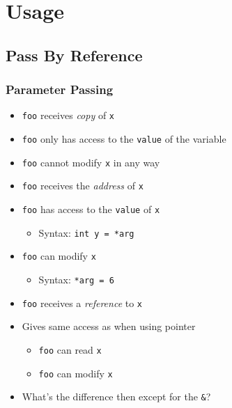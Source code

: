 \section{Usage}
\subsection{Pass By Reference}

\frame{\tableofcontents[currentsubsection]}


\begin{frame}
  \frametitle{Parameter Passing}
  \begin{overprint}


  \end{overprint}
  \vskip5mm
  \begin{overprint}
    \begin{itemize}
      \item {\tt foo} receives \emph{copy} of {\tt x}
      \item {\tt foo} only has access to the {\tt value} of the variable
      \item {\tt foo} cannot modify {\tt x} in any way
    \end{itemize}

    \begin{itemize}
      \item \texttt{foo} receives the \emph{address} of \texttt{x}
      \item \texttt{foo} has access to the {\tt value} of \texttt{x}
            \begin{itemize}
              \item Syntax: \texttt{int y = *arg}
            \end{itemize}
      \item \texttt{foo} can modify {\tt x}
            \begin{itemize}
              \item Syntax: \texttt{*arg = 6}
            \end{itemize}
    \end{itemize}

    \begin{itemize}
      \item {\tt foo} receives a \emph{reference} to {\tt x}
      \item Gives same access as when using pointer
            \begin{itemize}
              \item \texttt{foo} can read \texttt{x}
              \item \texttt{foo} can modify \texttt{x}
            \end{itemize}
      \item What's the difference then except for the \texttt{\&}?
    \end{itemize}
  \end{overprint}
\end{frame}

